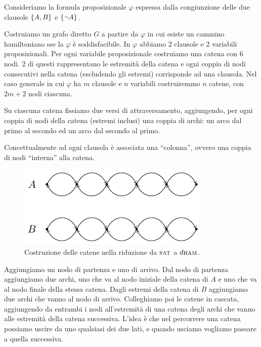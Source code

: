 Consideriamo la formula proposizionale $\varphi$ espressa dalla congiunzione delle due clausole
$\left\{A,B\right\}$ e $\left\{\lnot A\right\}$.

Costruiamo un grafo diretto $G$ a partire da $\varphi$ in cui esiste un cammino hamiltoniano sse la
$\varphi$ è soddisfacibile. In $\varphi$ abbiamo 2 clausole e 2 variabili proposizionali. Per ogni
variabile proposizionale costruiamo una catena con 6 nodi. 2 di questi rappresentano le estremità
della catena e ogni coppia di nodi consecutivi nella catena (escludendo gli estremi) corrisponde ad
una clausola.  Nel caso generale in cui $\varphi$ ha $m$ clausole e $n$ variabili costruiremmo $n$
catene, con $2m + 2$ nodi ciascuna. 

Su ciascuna catena fissiamo due versi di attraversamento, aggiungendo, per ogni coppia di nodi della
catena (estremi inclusi) una coppia di archi: un arco dal primo al secondo ed un arco dal secondo al
primo.

Concettualmente ad ogni clausola è associata una ``colonna'', ovvero una coppia di nodi ``interna''
alla catena.

\begin{figure}[h]
    \begin{center}
        \includegraphics{./img/NPClass/SATdHAM1.pdf}
        \caption{Costruzione delle catene nella riduzione da $\textsc{sat}$ a $d\textsc{ham}$.}
    \end{center}
\end{figure}

Aggiungiamo un nodo di partenza e uno di arrivo. Dal nodo di partenza aggiungiamo due archi, uno che
va al nodo iniziale della catena di $A$ e uno che va al nodo finale della stessa catena. Dagli
estremi della catena di $B$ aggiungiamo due archi che vanno al nodo di arrivo. Colleghiamo poi le
catene in cascata, aggiungendo da entrambi i nodi all'estremità di una catena degli archi che vanno
alle estremità della catena successiva. L'idea è che nel percorrere una catena possiamo uscire da
uno qualsiasi dei due lati, e quando usciamo vogliamo passare a quella successiva.

